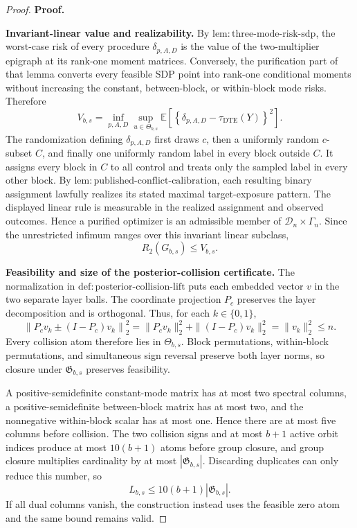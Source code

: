 \documentclass{article}
\begin{document}
\begin{proof}
\textbf{Proof.}

\textbf{Invariant-linear value and realizability.}
By \(\mathrm{lem{:}three\text{-}mode\text{-}risk\text{-}sdp}\), the worst-case risk of every procedure \(\delta_{p,A,D}\) is the value of the two-multiplier epigraph at its rank-one moment matrices. Conversely, the purification part of that lemma converts every feasible SDP point into rank-one conditional moments without increasing the constant, between-block, or within-block mode risks. Therefore
\[
V_{b,s}
=\inf_{p,A,D}\sup_{u\in\Theta_{b,s}}
\mathbb E\!\left[\left\{\delta_{p,A,D}-\tau_{\mathrm{DTE}}(Y)\right\}^2\right].
\tag{1}
\]
The randomization defining \(\delta_{p,A,D}\) first draws \(c\), then a uniformly random \(c\)-subset \(C\), and finally one uniformly random label in every block outside \(C\). It assigns every block in \(C\) to all control and treats only the sampled label in every other block. By \(\mathrm{lem{:}published\text{-}conflict\text{-}calibration}\), each resulting binary assignment lawfully realizes its stated maximal target-exposure pattern. The displayed linear rule is measurable in the realized assignment and observed outcomes. Hence a purified optimizer is an admissible member of \(\mathcal D_n\times\Gamma_n\). Since the unrestricted infimum ranges over this invariant linear subclass,
\[
R_2(G_{b,s})\leq V_{b,s}.
\tag{2}
\]

\textbf{Feasibility and size of the posterior-collision certificate.}
The normalization in \(\mathrm{def{:}posterior\text{-}collision\text{-}lift}\) puts each embedded vector \(v\) in the two separate layer balls. The coordinate projection \(P_c\) preserves the layer decomposition and is orthogonal. Thus, for each \(k\in\{0,1\}\),
\[
\left\|P_cv_k\mathbin{\pm}(I-P_c)v_k\right\|_2^2
=\|P_cv_k\|_2^2+\|(I-P_c)v_k\|_2^2
=\|v_k\|_2^2\leq n.
\tag{3}
\]
Every collision atom therefore lies in \(\Theta_{b,s}\). Block permutations, within-block permutations, and simultaneous sign reversal preserve both layer norms, so closure under \(\mathfrak G_{b,s}\) preserves feasibility.

A positive-semidefinite constant-mode matrix has at most two spectral columns, a positive-semidefinite between-block matrix has at most two, and the nonnegative within-block scalar has at most one. Hence there are at most five columns before collision. The two collision signs and at most \(b+1\) active orbit indices produce at most \(10(b+1)\) atoms before group closure, and group closure multiplies cardinality by at most \(|\mathfrak G_{b,s}|\). Discarding duplicates can only reduce this number, so
\[
L_{b,s}\leq10(b+1)|\mathfrak G_{b,s}|.
\tag{4}
\]
If all dual columns vanish, the construction instead uses the feasible zero atom and the same bound remains valid.


\end{proof}
\end{document}
